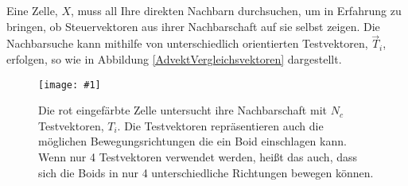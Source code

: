 \documentclass[a4paper, 10pt, journal]{wissarbIEEE}      %
\newcommand{\bild}[3]{
\begin{figure}[h]
\centering
  \texttt{[image: \#1]}
  \caption{#3}
  \label{#1}
\end{figure}}
\newcommand{\length}[1]{\lvert \vec{#1} \rvert}
\begin{document}






Eine Zelle, $X$, muss all Ihre direkten Nachbarn durchsuchen, um in Erfahrung zu bringen, ob Steuervektoren aus ihrer Nachbarschaft auf sie selbst zeigen. Die Nachbarsuche kann mithilfe von unterschiedlich orientierten Testvektoren, $\vec{T}_i$, erfolgen, so wie in Abbildung \ref{AdvektVergleichsvektoren} dargestellt.

\bild{bilder/AdvektVergleichsvektoren}{8.5cm}{Die rot eingefärbte Zelle untersucht ihre Nachbarschaft mit $N_c$ Testvektoren, $T_i$. Die Testvektoren repräsentieren auch die möglichen Bewegungsrichtungen die ein Boid einschlagen kann. Wenn nur 4 Testvektoren verwendet werden, heißt das auch, dass sich die Boids in nur 4 unterschiedliche Richtungen bewegen können.}
\end{document}
